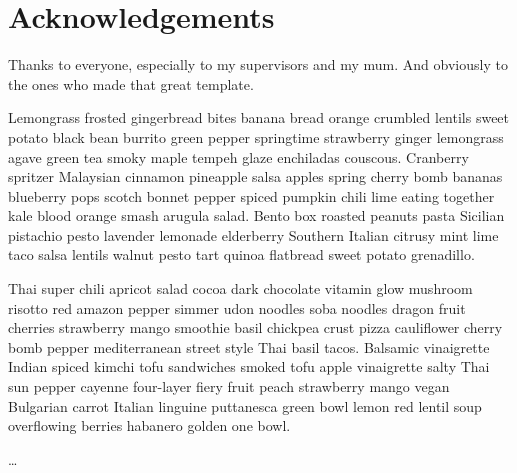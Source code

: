 
\chapter*{Acknowledgements}

Thanks to everyone, especially to my supervisors and my mum. 
And obviously to the ones who made that great template.

Lemongrass frosted gingerbread bites banana bread orange crumbled lentils sweet potato black bean burrito green pepper springtime strawberry ginger lemongrass agave green tea smoky maple tempeh glaze enchiladas couscous. Cranberry spritzer Malaysian cinnamon pineapple salsa apples spring cherry bomb bananas blueberry pops scotch bonnet pepper spiced pumpkin chili lime eating together kale blood orange smash arugula salad. Bento box roasted peanuts pasta Sicilian pistachio pesto lavender lemonade elderberry Southern Italian citrusy mint lime taco salsa lentils walnut pesto tart quinoa flatbread sweet potato grenadillo. 

Thai super chili apricot salad cocoa dark chocolate vitamin glow mushroom risotto red amazon pepper simmer udon noodles soba noodles dragon fruit cherries strawberry mango smoothie basil chickpea crust pizza cauliflower cherry bomb pepper mediterranean street style Thai basil tacos. Balsamic vinaigrette Indian spiced kimchi tofu sandwiches smoked tofu apple vinaigrette salty Thai sun pepper cayenne four-layer fiery fruit peach strawberry mango vegan Bulgarian carrot Italian linguine puttanesca green bowl lemon red lentil soup overflowing berries habanero golden one bowl. 

\ldots



 